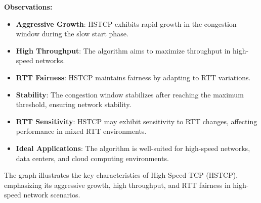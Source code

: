 \documentclass[11pt,a4paper]{article}
\begin{document}
\textbf{Observations:}
\begin{itemize}
    \item \textbf{Aggressive Growth}: HSTCP exhibits rapid growth in the congestion window during the slow start phase.
    \item \textbf{High Throughput}: The algorithm aims to maximize throughput in high-speed networks.
    \item \textbf{RTT Fairness}: HSTCP maintains fairness by adapting to RTT variations.
    \item \textbf{Stability}: The congestion window stabilizes after reaching the maximum threshold, ensuring network stability.
    \item \textbf{RTT Sensitivity}: HSTCP may exhibit sensitivity to RTT changes, affecting performance in mixed RTT environments.
    \item \textbf{Ideal Applications}: The algorithm is well-suited for high-speed networks, data centers, and cloud computing environments.
\end{itemize}

The graph illustrates the key characteristics of High-Speed TCP (HSTCP), emphasizing its aggressive growth, high throughput, and RTT fairness in high-speed network scenarios.
\end{document}
